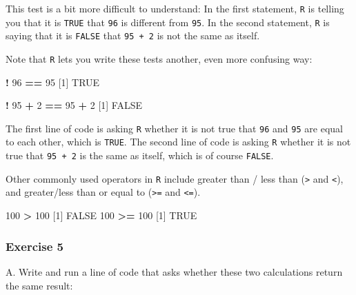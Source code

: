\documentclass[
]{book}
\newenvironment{Shaded}{\begin{snugshade}}{\end{snugshade}}
\newcommand{\DecValTok}[1]{\textcolor[rgb]{0.00,0.00,0.81}{#1}}
\newcommand{\NormalTok}[1]{#1}
\newcommand{\OperatorTok}[1]{\textcolor[rgb]{0.81,0.36,0.00}{\textbf{#1}}}
\newcommand{\OtherTok}[1]{\textcolor[rgb]{0.56,0.35,0.01}{#1}}
\newcommand{\StringTok}[1]{\textcolor[rgb]{0.31,0.60,0.02}{#1}}
\begin{document}
This test is a bit more difficult to understand: In the first statement, \texttt{R} is telling you that it is \texttt{TRUE} that \texttt{96} is different from \texttt{95}. In the second statement, \texttt{R} is saying that it is \texttt{FALSE} that \texttt{95\ +\ 2} is not the same as itself.

Note that \texttt{R} lets you write these tests another, even more confusing way:

\begin{Shaded}
\begin{Highlighting}[]
\OperatorTok{!}\StringTok{ }\DecValTok{96} \OperatorTok{==}\StringTok{ }\DecValTok{95}
\NormalTok{[}\DecValTok{1}\NormalTok{] }\OtherTok{TRUE}

\OperatorTok{!}\StringTok{ }\DecValTok{95} \OperatorTok{+}\StringTok{ }\DecValTok{2} \OperatorTok{==}\StringTok{ }\DecValTok{95} \OperatorTok{+}\StringTok{ }\DecValTok{2}
\NormalTok{[}\DecValTok{1}\NormalTok{] }\OtherTok{FALSE}
\end{Highlighting}
\end{Shaded}

The first line of code is asking \texttt{R} whether it is not true that \texttt{96} and \texttt{95} are equal to each other, which is \texttt{TRUE}. The second line of code is asking \texttt{R} whether it is not true that \texttt{95\ +\ 2} is the same as itself, which is of course \texttt{FALSE}.

Other commonly used operators in \texttt{R} include greater than / less than (\texttt{\textgreater{}} and \texttt{\textless{}}), and greater/less than or equal to (\texttt{\textgreater{}=} and \texttt{\textless{}=}).

\begin{Shaded}
\begin{Highlighting}[]
\DecValTok{100} \OperatorTok{>}\StringTok{ }\DecValTok{100}
\NormalTok{[}\DecValTok{1}\NormalTok{] }\OtherTok{FALSE}
\DecValTok{100} \OperatorTok{>=}\StringTok{ }\DecValTok{100}
\NormalTok{[}\DecValTok{1}\NormalTok{] }\OtherTok{TRUE}
\end{Highlighting}
\end{Shaded}

\hypertarget{exercise-5}{%
\subsubsection*{Exercise 5}\label{exercise-5}}

A. Write and run a line of code that asks whether these two calculations return the same result:
\end{document}
